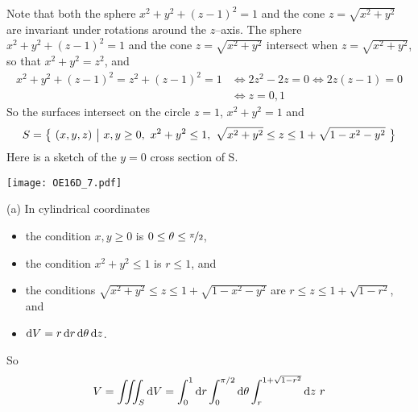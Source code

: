 \begin{solution}
Note that both the sphere $x^2+y^2+(z-1)^2=1$
and the cone $z=\sqrt{x^2+y^2}$  are invariant under rotations
around the $z$--axis. The sphere $x^2 + y^2 + (z-1)^2 = 1$ 
and the cone $z = \sqrt{x^2 + y^2}$ intersect when $z=\sqrt{x^2+y^2}$, so that
$x^2+y^2=z^2$, and
\begin{align*}
x^2 + y^2 + (z-1)^2 = z^2+(z-1)^2=1
&\iff 2z^2-2z=0
\iff 2z(z-1)=0 \\
&\iff z=0,1
\end{align*}
So the surfaces intersect on the circle $z=1$,
$x^2+y^2=1$ and
\begin{equation*}
S = \Set{(x,y,z)}{x,y\ge 0,\  x^2+y^2\le 1,\ 
         \sqrt{x^2+y^2}\le z\le 1+\sqrt{1-x^2-y^2}}
\end{equation*}
Here is a sketch of the $y=0$ cross section of S.
\begin{center}
     \texttt{[image: OE16D\_7.pdf]}
\end{center}

(a) In cylindrical coordinates
\begin{itemize}
\item
the condition $x,y\ge 0$ is $0\le\theta\le\nicefrac{\pi}{2}$,
\item
the condition $x^2+y^2\le 1$ is $r\le 1$, and
\item
the conditions $\sqrt{x^2+y^2}\le z\le 1+\sqrt{1-x^2-y^2}$
are $r\le z\le 1+\sqrt{1-r^2}$, and
\item
$\mathrm{d}V = r\,\mathrm{d}r\,\mathrm{d}\theta\,\mathrm{d}z$.
\end{itemize}
So
\begin{align*}
V = \iiint_S\mathrm{d}V
  = \int_0^1\mathrm{d}r \int_0^{\pi/2}\mathrm{d}\theta\int_r^{1+\sqrt{1-r^2}}\mathrm{d}z
     \ r
\end{align*}


\end{solution}
